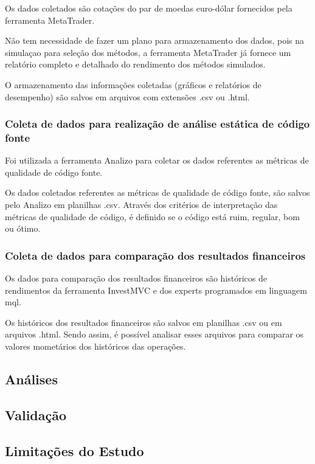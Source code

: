 Os dados coletados são cotações do par de moedas euro-dólar fornecidos pela ferramenta MetaTrader.

Não tem necessidade de fazer um plano para armazenamento dos dados, pois na simulaçao para seleção dos métodos, a ferramenta MetaTrader já fornece um relatório completo e detalhado do rendimento dos métodos simulados.

O armazenamento das  informações coletadas (gráficos e relatórios de desempenho) são salvos em arquivos com extensões .csv ou .html.

\subsubsection{Coleta de dados para realização de análise estática de código fonte}

Foi utilizada a ferramenta Analizo para coletar os dados referentes as métricas de qualidade de código fonte.

Os dados coletados referentes as métricas de qualidade de código fonte,  são salvos pelo Analizo em planilhas .csv. Através dos critérios de interpretação das métricas de qualidade de código, é definido se o código está ruim, regular, bom ou ótimo.

\subsubsection{Coleta de dados para comparação dos resultados financeiros}
Os dados para comparação dos resultados financeiros são históricos de rendimentos da ferramenta InvestMVC e dos experts programados em linguagem mql.

Os históricos dos resultados financeiros são salvos em planilhas .csv ou em arquivos .html. Sendo assim, é possível analisar esses arquivos para comparar os valores mometários dos históricos das operações.

\subsection{Análises} 
\subsection{Validação} 
\subsection{Limitações do Estudo}